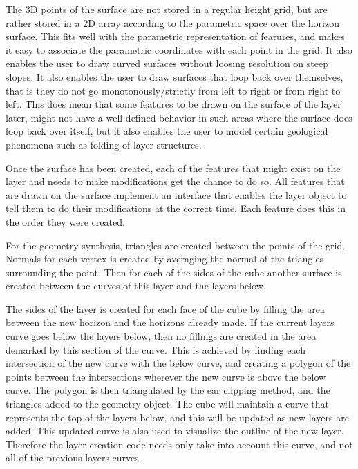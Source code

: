 \documentclass[a4paper,12pt]{report}
\begin{document}
The 3D points of the surface are not stored in a regular height grid, but are rather stored in a 2D array according to the parametric space over the horizon surface. This fits well with the parametric representation of features, and makes it easy to associate the parametric coordinates with each point in the grid. It also enables the user to draw curved surfaces without loosing resolution on steep slopes. It also enables the user to draw surfaces that loop back over themselves, that is they do not go monotonously/strictly from left to right or from right to left. This does mean that some features to be drawn on the surface of the layer later, might not have a well defined behavior in such areas where the surface does loop back over itself, but it also enables the user to model certain geological phenomena such as folding of layer structures.

Once the surface has been created, each of the features that might exist on the layer and needs to make modifications get the chance to do so. All features that are drawn on the surface implement an interface that enables the layer object to tell them to do their modifications at the correct time. Each feature does this in the order they were created.

For the geometry synthesis, triangles are created between the points of the grid. Normals for each vertex is created by averaging the normal of the triangles surrounding the point. Then for each of the sides of the cube another surface is created between the curves of this layer and the layers below.

The sides of the layer is created for each face of the cube by filling the area between the new horizon and the horizons already made. If the current layers curve goes below the layers below, then no fillings are created in the area demarked by this section of the curve. This is achieved by finding each intersection of the new curve with the below curve, and creating a polygon of the points between the intersections wherever the new curve is above the below curve. The polygon is then triangulated by the ear clipping method, and the triangles added to the geometry object. The cube will maintain a curve that represents the top of the layers below, and this will be updated as new layers are added. This updated curve is also used to visualize the outline of the new layer. Therefore the layer creation code needs only take into account this curve, and not all of the previous layers curves.
\end{document}
